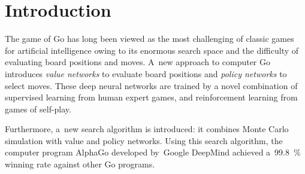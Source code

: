 \documentclass[a4paper,10pt]{article}
\begin{document}
\section{Introduction}
The game of Go has long been viewed as the most challenging of classic games for artificial intelligence owing to its enormous search space and the difficulty of evaluating board positions and moves.
A~new approach to computer Go introduces \emph{value networks} to evaluate board positions and \emph{policy networks} to select moves.
These deep neural networks are trained by a novel combination of supervised learning from human expert games, and reinforcement learning from games of self-play.

Furthermore, a~new search algorithm is introduced: it combines Monte Carlo simulation with value and policy networks.
Using this search algorithm, the computer program AlphaGo developed by~Google DeepMind achieved a~99.8~\% winning rate against other Go programs.
\end{document}
